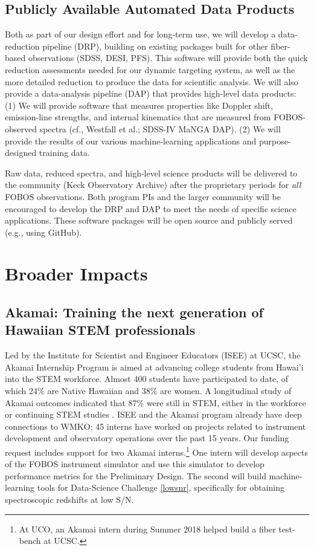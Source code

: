 \documentclass[oneside,11pt]{amsart}
\begin{document}
\subsection{Publicly Available Automated Data Products}
\label{sec:DAP}

Both as part of our design effort and for long-term use, we will develop
a data-reduction pipeline (DRP), building on existing packages built for
other fiber-based observations (SDSS, DESI, PFS).  This software will
provide both the quick reduction assessments needed for our dynamic
targeting system, as well as the more detailed reduction to produce the
data for scientific analysis.  We will also provide a data-analysis
pipeline (DAP) that provides high-level data products: (1) We will
provide software that measures properties like Doppler shift,
emission-line strengths, and internal kinematics that are measured from
FOBOS-observed spectra (cf., Westfall et al.; SDSS-IV MaNGA DAP).  (2) We
will provide the results of our various machine-learning applications
and purpose-designed training data.

Raw data, reduced spectra, and high-level science products will be
delivered to the community (Keck Observatory Archive) after the
proprietary periods for {\it all} FOBOS observations.  Both program PIs
and the larger community will be encouraged to develop the DRP and DAP
to meet the needs of specific science applications.  These software
packages will be open source and publicly served (e.g., using GitHub).

\section{Broader Impacts}
\label{sec:bi}

\subsection{Akamai: Training the next generation of Hawaiian STEM
professionals} Led by the Institute for Scientist and Engineer Educators
(ISEE) at UCSC, the Akamai Internship Program is aimed at advancing
college students from Hawai'i into the STEM workforce.  Almost 400
students have participated to date, of which 24\% are Native Hawaiian
and 38\% are women. A longitudinal study of Akamai outcomes indicated
that 87\% were still in STEM, either in the workforce or continuing STEM
studies \citep{asee_peer_31030}.  ISEE and the Akamai program already have deep connections to WMKO; 45 interns have
worked on projects related to instrument
development and observatory operations over the past 15 years.  Our
funding request includes support for two Akamai interns.\footnote{
%
At UCO, an Akamai intern during Summer 2018 helped build a fiber
test-bench at UCSC.}
%
One intern will develop aspects of the FOBOS instrument simulator and use this simulator to develop performance metrics
for the Preliminary Design.  The second will build machine-learning tools for Data-Science Challenge \ref{lowsnr},
specifically for obtaining spectroscopic redshifts at low S/N.
\end{document}
